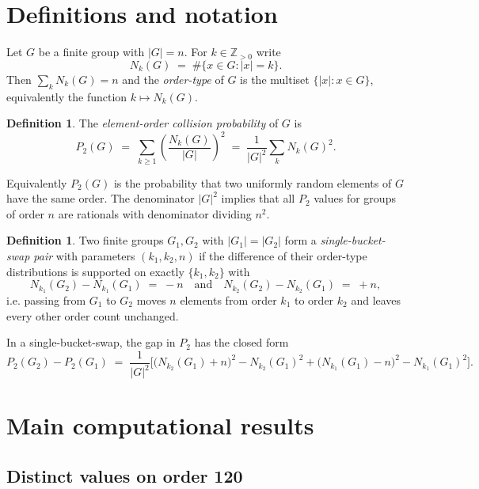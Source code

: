 \documentclass[11pt]{amsart}
\theoremstyle{plain}
\theoremstyle{definition}
\newtheorem{definition}[theorem]{Definition}
\begin{document}
\section{Definitions and notation}

Let $G$ be a finite group with $|G| = n$. For $k \in \mathbb{Z}_{>0}$ write
\[
  N_k(G) \;=\; \#\{x \in G : |x| = k\}.
\]
Then $\sum_k N_k(G) = n$ and the \emph{order-type} of $G$ is the multiset $\{|x| : x \in G\}$, equivalently the function $k \mapsto N_k(G)$.

\begin{definition}
The \emph{element-order collision probability} of $G$ is
\[
  P_2(G) \;=\; \sum_{k \geq 1} \left(\frac{N_k(G)}{|G|}\right)^2 \;=\; \frac{1}{|G|^2}\sum_k N_k(G)^2.
\]
\end{definition}

Equivalently $P_2(G)$ is the probability that two uniformly random elements of $G$ have the same order. The denominator $|G|^2$ implies that all $P_2$ values for groups of order $n$ are rationals with denominator dividing $n^2$.

\begin{definition}
Two finite groups $G_1, G_2$ with $|G_1| = |G_2|$ form a \emph{single-bucket-swap pair} with parameters $(k_1, k_2, n)$ if the difference of their order-type distributions is supported on exactly $\{k_1, k_2\}$ with
\[
  N_{k_1}(G_2) - N_{k_1}(G_1) \;=\; -n \quad\text{and}\quad N_{k_2}(G_2) - N_{k_2}(G_1) \;=\; +n,
\]
i.e. passing from $G_1$ to $G_2$ moves $n$ elements from order $k_1$ to order $k_2$ and leaves every other order count unchanged.
\end{definition}

In a single-bucket-swap, the gap in $P_2$ has the closed form
\begin{equation}
  P_2(G_2) - P_2(G_1) \;=\; \frac{1}{|G|^2}\Big[\big(N_{k_2}(G_1) + n\big)^2 - N_{k_2}(G_1)^2 + \big(N_{k_1}(G_1) - n\big)^2 - N_{k_1}(G_1)^2\Big].
\label{eq:swap-gap}
\end{equation}

\section{Main computational results}

\subsection{Distinct values on order 120}
\end{document}
